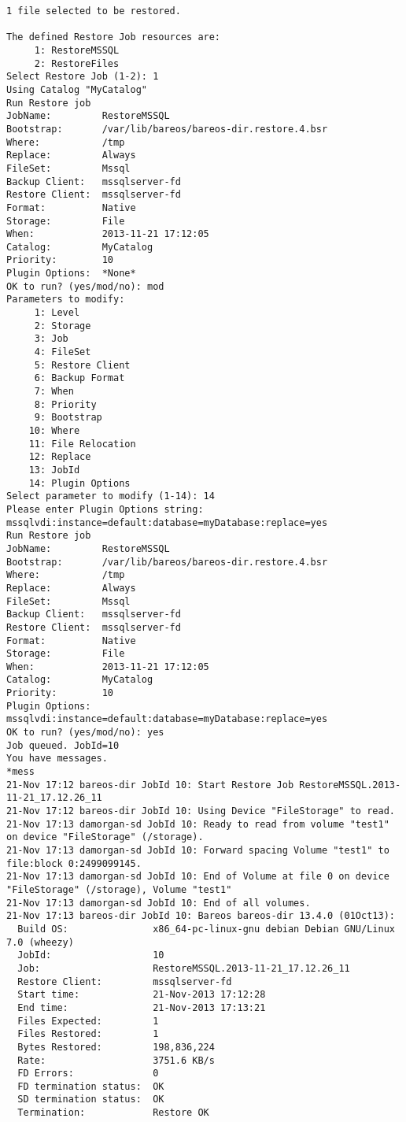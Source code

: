 \begin{verbatim}
1 file selected to be restored.

The defined Restore Job resources are:
     1: RestoreMSSQL
     2: RestoreFiles
Select Restore Job (1-2): 1
Using Catalog "MyCatalog"
Run Restore job
JobName:         RestoreMSSQL
Bootstrap:       /var/lib/bareos/bareos-dir.restore.4.bsr
Where:           /tmp
Replace:         Always
FileSet:         Mssql
Backup Client:   mssqlserver-fd
Restore Client:  mssqlserver-fd
Format:          Native
Storage:         File
When:            2013-11-21 17:12:05
Catalog:         MyCatalog
Priority:        10
Plugin Options:  *None*
OK to run? (yes/mod/no): mod
Parameters to modify:
     1: Level
     2: Storage
     3: Job
     4: FileSet
     5: Restore Client
     6: Backup Format
     7: When
     8: Priority
     9: Bootstrap
    10: Where
    11: File Relocation
    12: Replace
    13: JobId
    14: Plugin Options
Select parameter to modify (1-14): 14
Please enter Plugin Options string: mssqlvdi:instance=default:database=myDatabase:replace=yes
Run Restore job
JobName:         RestoreMSSQL
Bootstrap:       /var/lib/bareos/bareos-dir.restore.4.bsr
Where:           /tmp
Replace:         Always
FileSet:         Mssql
Backup Client:   mssqlserver-fd
Restore Client:  mssqlserver-fd
Format:          Native
Storage:         File
When:            2013-11-21 17:12:05
Catalog:         MyCatalog
Priority:        10
Plugin Options:  mssqlvdi:instance=default:database=myDatabase:replace=yes
OK to run? (yes/mod/no): yes
Job queued. JobId=10
You have messages.
*mess
21-Nov 17:12 bareos-dir JobId 10: Start Restore Job RestoreMSSQL.2013-11-21_17.12.26_11
21-Nov 17:12 bareos-dir JobId 10: Using Device "FileStorage" to read.
21-Nov 17:13 damorgan-sd JobId 10: Ready to read from volume "test1" on device "FileStorage" (/storage).
21-Nov 17:13 damorgan-sd JobId 10: Forward spacing Volume "test1" to file:block 0:2499099145.
21-Nov 17:13 damorgan-sd JobId 10: End of Volume at file 0 on device "FileStorage" (/storage), Volume "test1"
21-Nov 17:13 damorgan-sd JobId 10: End of all volumes.
21-Nov 17:13 bareos-dir JobId 10: Bareos bareos-dir 13.4.0 (01Oct13):
  Build OS:               x86_64-pc-linux-gnu debian Debian GNU/Linux 7.0 (wheezy)
  JobId:                  10
  Job:                    RestoreMSSQL.2013-11-21_17.12.26_11
  Restore Client:         mssqlserver-fd
  Start time:             21-Nov-2013 17:12:28
  End time:               21-Nov-2013 17:13:21
  Files Expected:         1
  Files Restored:         1
  Bytes Restored:         198,836,224
  Rate:                   3751.6 KB/s
  FD Errors:              0
  FD termination status:  OK
  SD termination status:  OK
  Termination:            Restore OK
\end{verbatim}
\normalsize

